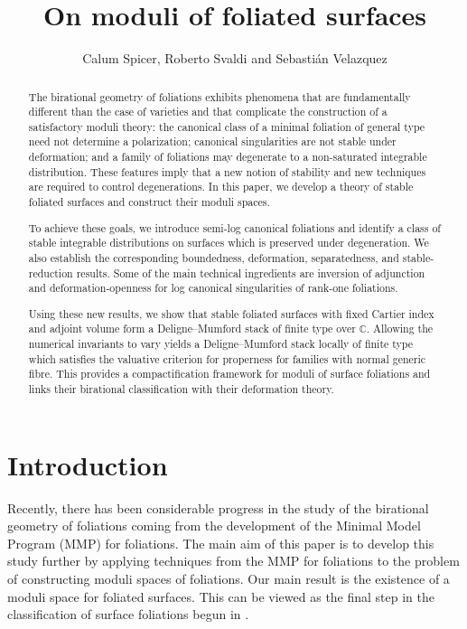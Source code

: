 \documentclass[12pt, a4paper]{amsart}
\title{On moduli of foliated surfaces}
\author{Calum Spicer, Roberto Svaldi and Sebasti\'{a}n Velazquez}
\date{}
\theoremstyle{definition}
\theoremstyle{named}
\begin{document}
\begin{abstract} 
The birational geometry of foliations exhibits phenomena that are fundamentally different than the case of varieties and that complicate the construction of a satisfactory moduli theory: 
the canonical class of a minimal foliation of general type need not determine a polarization; 
canonical singularities are not stable under deformation; 
and a family of foliations may degenerate to a non-saturated integrable distribution. 
These features imply that a new notion of stability and new techniques are required to control degenerations.
In this paper, we develop a theory of stable foliated surfaces and construct their moduli spaces. 

To achieve these goals, we introduce semi-log canonical foliations and identify a class of stable integrable distributions on surfaces which is preserved under degeneration. 
We also establish the corresponding boundedness, deformation, separatedness, and stable-reduction results. 
Some of the main technical ingredients are inversion of adjunction and deformation-openness for log canonical singularities of rank-one foliations.

Using these new results, we show that stable foliated surfaces with fixed Cartier index and adjoint volume form a Deligne--Mumford stack of finite type over $\mathbb C$. 
Allowing the numerical invariants to vary yields a Deligne--Mumford stack locally of finite type which satisfies the valuative criterion for properness for families with normal generic fibre. 
This provides a compactification framework for moduli of surface foliations and links their birational classification with their deformation theory.
\end{abstract}

\maketitle

\tableofcontents

\section{Introduction}
Recently, there has been considerable progress in the study of the birational geometry of foliations coming from the  development of the Minimal Model Program (MMP) for foliations.  The main aim of this paper is to develop this study further by applying techniques from the MMP for foliations to the problem of constructing moduli spaces of foliations.  Our main result is the existence of a moduli space for foliated surfaces.  This can be viewed as the final step in the classification of surface foliations begun in \cite{Brunella00, McQuillan08, Mendes00}.
\end{document}
